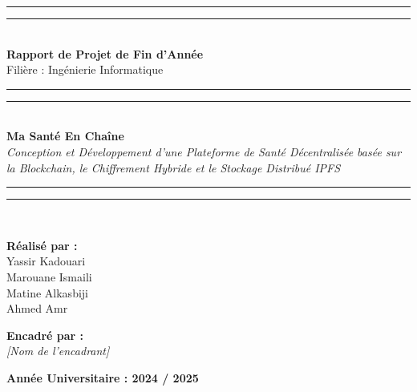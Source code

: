 \documentclass[12pt,a4paper]{report}
\begin{document}
\begin{titlepage}
    \begin{center}
        \vspace*{0.5cm}
        \rule{\textwidth}{1.6pt}\vspace*{-\baselineskip}\vspace*{2pt}
        \rule{\textwidth}{0.4pt}\\[\baselineskip]

        {\Large \textbf{Rapport de Projet de Fin d'Année}}\\[0.5cm]
        {\large Filière : Ingénierie Informatique}\\[1.5cm]

        \rule{\textwidth}{0.4pt}\vspace*{-\baselineskip}\vspace{3.5pt}
        \rule{\textwidth}{1.6pt}\\[\baselineskip]

        {\huge \textbf{Ma Santé En Chaîne}}\\[0.5cm]
        {\Large \textit{Conception et Développement d'une Plateforme de Santé Décentralisée basée sur la Blockchain, le Chiffrement Hybride et le Stockage Distribué IPFS}}\\[1.5cm]

        \rule{\textwidth}{0.4pt}\vspace*{-\baselineskip}\vspace{3.5pt}
        \rule{\textwidth}{1.6pt}\\[\baselineskip]

        \begin{minipage}[t]{0.45\textwidth}
            \textbf{Réalisé par :}\\[0.3cm]
            Yassir Kadouari\\
            Marouane Ismaili\\
            Matine Alkasbiji\\
            Ahmed Amr
        \end{minipage}
        \hfill
        \begin{minipage}[t]{0.45\textwidth}
            \raggedleft
            \textbf{Encadré par :}\\[0.3cm]
            \textit{[Nom de l'encadrant]}\\
        \end{minipage}

        \vfill

        \textbf{Année Universitaire : 2024 / 2025}
    \end{center}
\end{titlepage}
\end{document}
